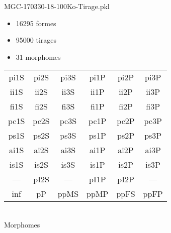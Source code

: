 MGC-170330-18-100Ko-Tirage.pkl
\begin{itemize}
\item 16295 formes
\item 95000 tirages
\item 31 morphomes
\end{itemize}
\begin{center}
\begin{tabular}{cccccc}
\hline
\cellcolor{white}pi1S & \cellcolor{orange}pi2S & \cellcolor{orange}pi3S & \cellcolor{white}pi1P & \cellcolor{white}pi2P & \cellcolor{white}pi3P\\
\cellcolor{brown}ii1S & \cellcolor{brown}ii2S & \cellcolor{brown}ii3S & \cellcolor{white}ii1P & \cellcolor{white}ii2P & \cellcolor{brown}ii3P\\
\cellcolor{yellow}fi1S & \cellcolor{lime}fi2S & \cellcolor{lime}fi3S & \cellcolor{green}fi1P & \cellcolor{white}fi2P & \cellcolor{green}fi3P\\
\cellcolor{yellow}pc1S & \cellcolor{yellow}pc2S & \cellcolor{yellow}pc3S & \cellcolor{white}pc1P & \cellcolor{white}pc2P & \cellcolor{yellow}pc3P\\
\cellcolor{teal}ps1S & \cellcolor{teal}ps2S & \cellcolor{teal}ps3S & \cellcolor{white}ps1P & \cellcolor{white}ps2P & \cellcolor{teal}ps3P\\
\cellcolor{white}ai1S & \cellcolor{lightgray}ai2S & \cellcolor{lightgray}ai3S & \cellcolor{white}ai1P & \cellcolor{pink}ai2P & \cellcolor{white}ai3P\\
\cellcolor{pink}is1S & \cellcolor{pink}is2S & \cellcolor{lightgray}is3S & \cellcolor{pink}is1P & \cellcolor{black}is2P & \cellcolor{pink}is3P\\
--- & \cellcolor{white}pI2S & --- & \cellcolor{white}pI1P & \cellcolor{white}pI2P & ---\\
\cellcolor{white}inf & \cellcolor{white}pP & \cellcolor{white}ppMS & \cellcolor{white}ppMP & \cellcolor{white}ppFS & \cellcolor{white}ppFP\\
\hline
\end{tabular}\\
Morphomes
\end{center}
\bigskip

